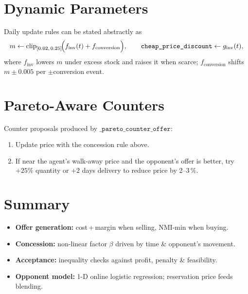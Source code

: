 \section{Dynamic Parameters}
Daily update rules can be stated abstractly as
\[
m \gets \operatorname{clip}_{[0.02,\,0.25]}
      \!\Bigl(f_{\text{inv}}(t) + f_{\text{conversion}}\Bigr),
\qquad
\texttt{cheap\_price\_discount}\gets g_{\text{inv}}(t),
\]
where \(f_{\text{inv}}\) lowers \(m\) under excess stock and raises it when scarce;
\(f_{\text{conversion}}\) shifts \(m\pm0.005\) per \(\pm\)conversion event.

\section{Pareto-Aware Counters}
Counter proposals produced by
\(\texttt{\_pareto\_counter\_offer}\):
\begin{enumerate}
  \item Update price with the concession rule above.
  \item If near the agent’s walk-away price and the opponent’s offer is better,
        try \(+25\%\) quantity or \(+2\) days delivery to reduce price by 2–3\,\%.
\end{enumerate}

\section*{Summary}
\begin{itemize}
  \item \textbf{Offer generation:} cost\,+\,margin when selling, NMI‐min when buying.
  \item \textbf{Concession:} non-linear factor \(\beta\) driven by time \& opponent’s movement.
  \item \textbf{Acceptance:} inequality checks against profit, penalty \& feasibility.
  \item \textbf{Opponent model:} 1-D online logistic regression; reservation price feeds blending.
\end{itemize}
